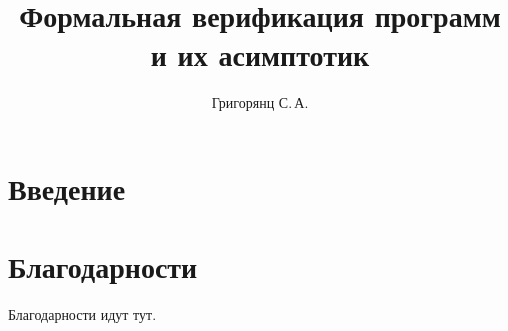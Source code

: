 \documentclass{mipt-thesis-bs}
\title{Формальная верификация программ и их асимптотик}
\author{Григорянц С.\,А.}
\begin{document}
\frontmatter
\titlecontents

\mainmatter


\chapter{Введение}


\backmatter

\printbib

\chapter{Благодарности}

Благодарности идут тут.
\end{document}
